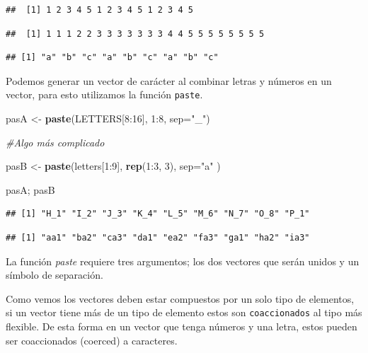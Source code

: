 \documentclass[]{article}
\newenvironment{Shaded}{\begin{snugshade}}{\end{snugshade}}
\newcommand{\KeywordTok}[1]{\textcolor[rgb]{0.13,0.29,0.53}{\textbf{{#1}}}}
\newcommand{\DataTypeTok}[1]{\textcolor[rgb]{0.13,0.29,0.53}{{#1}}}
\newcommand{\DecValTok}[1]{\textcolor[rgb]{0.00,0.00,0.81}{{#1}}}
\newcommand{\StringTok}[1]{\textcolor[rgb]{0.31,0.60,0.02}{{#1}}}
\newcommand{\CommentTok}[1]{\textcolor[rgb]{0.56,0.35,0.01}{\textit{{#1}}}}
\newcommand{\NormalTok}[1]{{#1}}
\begin{document}
\begin{verbatim}
##  [1] 1 2 3 4 5 1 2 3 4 5 1 2 3 4 5
\end{verbatim}

\begin{verbatim}
##  [1] 1 1 1 2 2 3 3 3 3 3 3 3 4 4 5 5 5 5 5 5 5 5
\end{verbatim}

\begin{verbatim}
## [1] "a" "b" "c" "a" "b" "c" "a" "b" "c"
\end{verbatim}

Podemos generar un vector de carácter al combinar letras y números en un
vector, para esto utilizamos la función \texttt{paste}.

\begin{Shaded}
\begin{Highlighting}[]
\NormalTok{pasA <-}\StringTok{ }\KeywordTok{paste}\NormalTok{(LETTERS[}\DecValTok{8}\NormalTok{:}\DecValTok{16}\NormalTok{], }\DecValTok{1}\NormalTok{:}\DecValTok{8}\NormalTok{, }\DataTypeTok{sep=}\StringTok{"_"}\NormalTok{)}

\CommentTok{#Algo más complicado}

\NormalTok{pasB <-}\StringTok{ }\KeywordTok{paste}\NormalTok{(letters[}\DecValTok{1}\NormalTok{:}\DecValTok{9}\NormalTok{], }\KeywordTok{rep}\NormalTok{(}\DecValTok{1}\NormalTok{:}\DecValTok{3}\NormalTok{, }\DecValTok{3}\NormalTok{), }\DataTypeTok{sep=}\StringTok{"a"} \NormalTok{)}

\NormalTok{pasA; pasB}
\end{Highlighting}
\end{Shaded}

\begin{verbatim}
## [1] "H_1" "I_2" "J_3" "K_4" "L_5" "M_6" "N_7" "O_8" "P_1"
\end{verbatim}

\begin{verbatim}
## [1] "aa1" "ba2" "ca3" "da1" "ea2" "fa3" "ga1" "ha2" "ia3"
\end{verbatim}

La función \emph{paste} requiere tres argumentos; los dos vectores que
serán unidos y un símbolo de separación.

Como vemos los vectores deben estar compuestos por un solo tipo de
elementos, si un vector tiene más de un tipo de elemento estos son
\texttt{coaccionados} al tipo más flexible. De esta forma en un vector
que tenga números y una letra, estos pueden ser coaccionados (coerced) a
caracteres.
\end{document}
